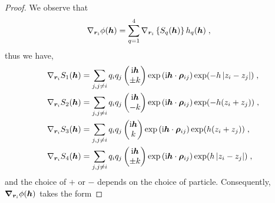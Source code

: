 \begin{proof}
We observe that 
\begin{align*}
 \nabla_{\bm{r}_i}\phi(\boldsymbol{h})&=   \sum_{q=1}^4 \nabla_{\bm{r}_i}\left\{S_q(\boldsymbol{h})\right\}h_q(\boldsymbol{h})\;,
\end{align*}
thus we have,
%
%
\begin{align*}
 \nabla_{\bm{r}_i} S_1(\boldsymbol{h})&=\sum_{j,j\neq i}q_iq_j   \begin{pmatrix} \mathrm{i} \boldsymbol{h} \\
 \pm k  \end{pmatrix}\exp{(\mathrm{i} \boldsymbol{h} \cdot \boldsymbol{\rho}_{ij})}\exp(-h\left\lvert z_i-z_j\right\rvert)\;,\\
 \nabla_{\bm{r}_i} S_2(\boldsymbol{h})&=\sum_{j,j\neq i}q_iq_j   \begin{pmatrix} \mathrm{i} \boldsymbol{h} \\
 -k  \end{pmatrix}\exp{(\mathrm{i} \boldsymbol{h} \cdot \boldsymbol{\rho}_{ij})}\exp(-h(z_i+z_j))\;,\\
  \nabla_{\bm{r}_i} S_3(\boldsymbol{h})&=\sum_{j,j\neq i}q_iq_j   \begin{pmatrix} \mathrm{i} \boldsymbol{h} \\
 k  \end{pmatrix}\exp{(\mathrm{i} \boldsymbol{h} \cdot \boldsymbol{\rho}_{ij})}\exp(h(z_i+z_j))\;,\\
 \nabla_{\bm{r}_i} S_4(\boldsymbol{h})&=\sum_{j,j\neq i}q_iq_j   \begin{pmatrix} \mathrm{i} \boldsymbol{h} \\
 \pm k  \end{pmatrix}\exp{(\mathrm{i} \boldsymbol{h} \cdot \boldsymbol{\rho}_{ij})}\exp(h\left\lvert z_i-z_j\right\rvert)\;,\\
\end{align*}
and  the choice of $+$ or $-$ depends on the choice of particle. Consequently, $\boldsymbol{\nabla}_{\boldsymbol{r}_i} \phi(\boldsymbol{h})$ takes the form

\end{proof}

